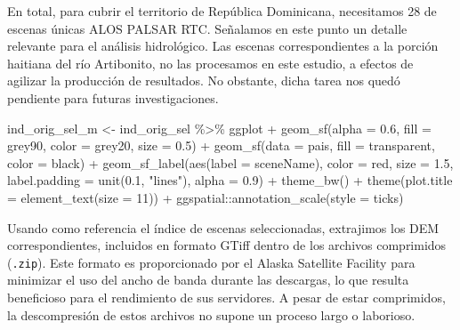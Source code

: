\documentclass[spanish]{article}
\newenvironment{Shaded}{\begin{snugshade}}{\end{snugshade}}
\newcommand{\AttributeTok}[1]{\textcolor[rgb]{0.77,0.63,0.00}{#1}}
\newcommand{\DecValTok}[1]{\textcolor[rgb]{0.00,0.00,0.81}{#1}}
\newcommand{\FloatTok}[1]{\textcolor[rgb]{0.00,0.00,0.81}{#1}}
\newcommand{\FunctionTok}[1]{\textcolor[rgb]{0.00,0.00,0.00}{#1}}
\newcommand{\NormalTok}[1]{#1}
\newcommand{\OtherTok}[1]{\textcolor[rgb]{0.56,0.35,0.01}{#1}}
\newcommand{\SpecialCharTok}[1]{\textcolor[rgb]{0.00,0.00,0.00}{#1}}
\newcommand{\StringTok}[1]{\textcolor[rgb]{0.31,0.60,0.02}{#1}}
\begin{document}
En total, para cubrir el territorio de República Dominicana, necesitamos
28 de escenas únicas ALOS PALSAR RTC. Señalamos en este punto un detalle
relevante para el análisis hidrológico. Las escenas correspondientes a
la porción haitiana del río Artibonito, no las procesamos en este
estudio, a efectos de agilizar la producción de resultados. No obstante,
dicha tarea nos quedó pendiente para futuras investigaciones.

\begin{Shaded}
\begin{Highlighting}[]
\NormalTok{ind\_orig\_sel\_m }\OtherTok{\textless{}{-}}\NormalTok{ ind\_orig\_sel }\SpecialCharTok{\%\textgreater{}\%}
\NormalTok{  ggplot }\SpecialCharTok{+}
  \FunctionTok{geom\_sf}\NormalTok{(}\AttributeTok{alpha =} \FloatTok{0.6}\NormalTok{, }\AttributeTok{fill =} \StringTok{\textquotesingle{}grey90\textquotesingle{}}\NormalTok{, }\AttributeTok{color =} \StringTok{\textquotesingle{}grey20\textquotesingle{}}\NormalTok{, }\AttributeTok{size =} \FloatTok{0.5}\NormalTok{) }\SpecialCharTok{+}
  \FunctionTok{geom\_sf}\NormalTok{(}\AttributeTok{data =}\NormalTok{ pais, }\AttributeTok{fill =} \StringTok{\textquotesingle{}transparent\textquotesingle{}}\NormalTok{, }\AttributeTok{color =} \StringTok{\textquotesingle{}black\textquotesingle{}}\NormalTok{) }\SpecialCharTok{+}
  \FunctionTok{geom\_sf\_label}\NormalTok{(}\FunctionTok{aes}\NormalTok{(}\AttributeTok{label =}\NormalTok{ sceneName), }\AttributeTok{color =} \StringTok{\textquotesingle{}red\textquotesingle{}}\NormalTok{, }\AttributeTok{size =} \FloatTok{1.5}\NormalTok{,}
                \AttributeTok{label.padding =} \FunctionTok{unit}\NormalTok{(}\FloatTok{0.1}\NormalTok{, }\StringTok{"lines"}\NormalTok{), }\AttributeTok{alpha =} \FloatTok{0.9}\NormalTok{) }\SpecialCharTok{+}
  \FunctionTok{theme\_bw}\NormalTok{() }\SpecialCharTok{+} 
  \FunctionTok{theme}\NormalTok{(}\AttributeTok{plot.title =} \FunctionTok{element\_text}\NormalTok{(}\AttributeTok{size =} \DecValTok{11}\NormalTok{)) }\SpecialCharTok{+}
\NormalTok{  ggspatial}\SpecialCharTok{::}\FunctionTok{annotation\_scale}\NormalTok{(}\AttributeTok{style =} \StringTok{\textquotesingle{}ticks\textquotesingle{}}\NormalTok{)}
\end{Highlighting}
\end{Shaded}

Usando como referencia el índice de escenas seleccionadas, extrajimos
los DEM correspondientes, incluidos en formato GTiff dentro de los
archivos comprimidos (\texttt{.zip}). Este formato es proporcionado por
el Alaska Satellite Facility para minimizar el uso del ancho de banda
durante las descargas, lo que resulta beneficioso para el rendimiento de
sus servidores. A pesar de estar comprimidos, la descompresión de estos
archivos no supone un proceso largo o laborioso.
\end{document}
